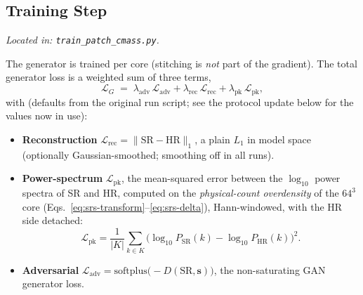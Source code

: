 \subsection{Training Step}
\textit{Located in: \texttt{train\_patch\_cmass.py}.}

The generator is trained per core (stitching is \emph{not} part of the
gradient). The total generator loss is a weighted sum of three terms,
\begin{equation}
  \mathcal L_G \;=\; \lambda_\text{adv}\,\mathcal L_\text{adv}
                  + \lambda_\text{rec}\,\mathcal L_\text{rec}
                  + \lambda_\text{pk}\,\mathcal L_\text{pk},
  \label{eq:srs-lossG}
\end{equation}
with (defaults from the original run script; see the protocol update below for
the values now in use):
\begin{itemize}
  \item \textbf{Reconstruction} $\mathcal L_\text{rec}=\lVert \mathrm{SR}-\mathrm{HR}\rVert_1$,
  a plain $L_1$ in model space (optionally Gaussian-smoothed; smoothing off in
  all runs).
  \item \textbf{Power-spectrum} $\mathcal L_\text{pk}$, the mean-squared error
  between the $\log_{10}$ power spectra of SR and HR, computed on the
  \emph{physical-count overdensity} of the $64^3$ core (Eqs.~\ref{eq:srs-transform}--\ref{eq:srs-delta}),
  Hann-windowed, with the HR side detached:
  \begin{equation}
    \mathcal L_\text{pk} = \frac{1}{|K|}\sum_{k\in K}
      \big(\log_{10} P_\text{SR}(k) - \log_{10} P_\text{HR}(k)\big)^2 .
    \label{eq:srs-pkloss}
  \end{equation}
  \item \textbf{Adversarial} $\mathcal L_\text{adv}=\mathrm{softplus}\!\big({-}D(\mathrm{SR},\mathbf s)\big)$,
  the non-saturating GAN generator loss.
\end{itemize}

